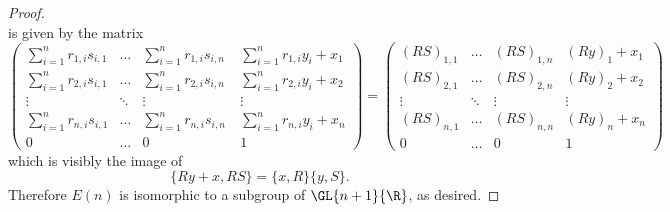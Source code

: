 \documentclass[10pt]{amsart}
\begin{document}
\begin{ex}
\begin{proof}
$$      $$
      is given by the matrix
      $$\left(
      \begin{matrix}
        \sum_{i = 1}^n r_{1,i}s_{i,1} & \ldots & \sum_{i = 1}^n r_{1,i}s_{i,n} & \sum_{i = 1}^n r_{1,i}y_i + x_1\\
        \sum_{i = 1}^n r_{2,i}s_{i,1} & \ldots & \sum_{i = 1}^n r_{2,i}s_{i,n} \ & \sum_{i = 1}^n r_{2,i}y_i + x_2\\
        \vdots & \ddots & \vdots & \vdots\\
        \sum_{i = 1}^n r_{n,i}s_{i,1} & \ldots & \sum_{i = 1}^n r_{n,i}s_{i,n} \ & \sum_{i = 1}^n r_{n,i}y_i + x_n\\
        0 & \ldots & 0 & 1
      \end{matrix}
      \right) = 
      \left(
      \begin{matrix}
        (RS)_{1,1} & \ldots & (RS)_{1,n} & (Ry)_1 + x_1\\
        (RS)_{2,1} & \ldots & (RS)_{2,n} & (Ry)_2 + x_2\\
        \vdots & \ddots & \vdots & \vdots\\
        (RS)_{n,1} & \ldots & (RS)_{n,n} & (Ry)_n + x_n\\
        0 & \ldots & 0 & 1
      \end{matrix}
      \right)$$
      which is visibly the image of 
      $$\{Ry + x, RS\} = \{x, R\}\{y,S\}.$$
      Therefore $E(n)$ is isomorphic to a subgroup of $\GL{n+1}{\R}$, as desired.
  \end{proof}
\end{ex}
\end{document}
